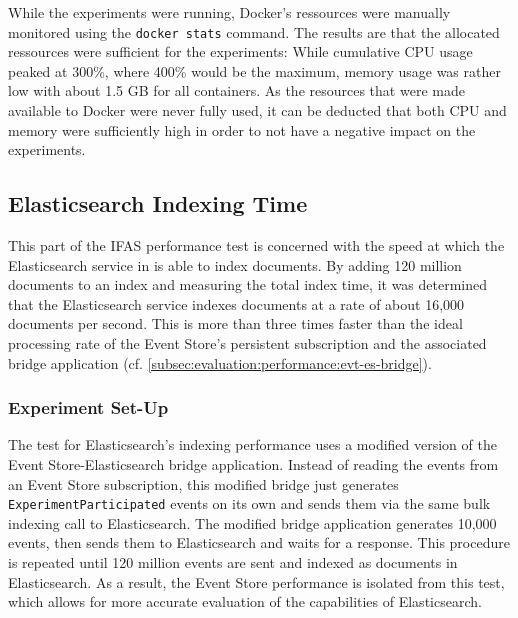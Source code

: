 
While the experiments were running, Docker's ressources were manually monitored using the \texttt{docker stats} command.
The results are that the allocated ressources were sufficient for the experiments:
While cumulative CPU usage peaked at 300\%, where 400\% would be the maximum, memory usage was rather low with about 1.5 GB for all containers.
As the resources that were made available to Docker were never fully used, it can be deducted that both CPU and memory were sufficiently high in order to not have a negative impact on the experiments.

\subsection{Elasticsearch Indexing Time}
\label{subsec:evaluation:performance:elasticsearch}

This part of the \ac{IFAS} performance test is concerned with the speed at which the Elasticsearch service in is able to index documents.
By adding 120 million documents to an index and measuring the total index time, it was determined that the Elasticsearch service indexes documents at a rate of about 16,000 documents per second.
This is more than three times faster than the ideal processing rate of the Event Store's persistent subscription and the associated bridge application (cf. \cref{subsec:evaluation:performance:evt-es-bridge}).

\subsubsection{Experiment Set-Up}

The test for Elasticsearch's indexing performance uses a modified version of the Event Store-Elasticsearch bridge application.
Instead of reading the events from an Event Store subscription, this modified bridge just generates \texttt{ExperimentParticipated} events on its own and sends them via the same bulk indexing call to Elasticsearch.
The modified bridge application generates 10,000 events, then sends them to Elasticsearch and waits for a response.
This procedure is repeated until 120 million events are sent and indexed as documents in Elasticsearch.
As a result, the Event Store performance is isolated from this test, which allows for more accurate evaluation of the capabilities of Elasticsearch.

